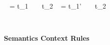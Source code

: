 \begin{figure}[H]
	\hrulefill
	\begin{spacing}{1.1} 	
	
	{}
	
	{ ~  = t_{1} ~ ~ {t_{2}}\mem
		\rightarrow 
		 ~  = t_{1}' ~ ~ {t_{2}}\memp}
  
%  
%  
%
%
\end{spacing}
\caption{ \textbf{\gml Semantics Context Rules} \hfill}
\hrulefill	\\
\end{figure}

